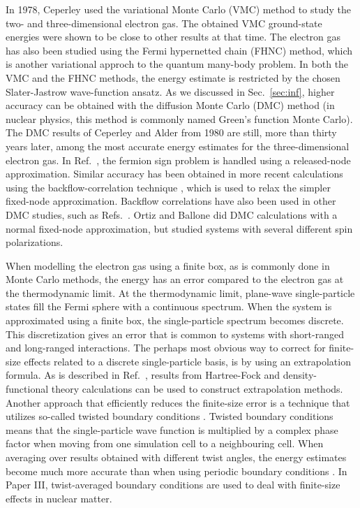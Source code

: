 \documentclass[a4paper,12pt]{report}
\begin{document}
In 1978, Ceperley used \cite{ceperley1978} 
the variational Monte Carlo (VMC) method to 
study the two- and three-dimensional electron gas. The
obtained VMC ground-state energies were shown to be close
to other results at that time. The electron gas has also
been studied \cite{lantto1980} using the Fermi hypernetted 
chain (FHNC) method, which is another variational approch to the
quantum many-body problem. In both the VMC and the FHNC 
methods, the energy estimate is restricted by the chosen
Slater-Jastrow wave-function ansatz. As we discussed in 
Sec.~\ref{sec:inf}, higher accuracy can be obtained with
the diffusion Monte Carlo (DMC) method (in nuclear physics,
this method is commonly named Green's function Monte Carlo). 
The DMC results of Ceperley and Alder from 1980 
\cite{ceperley1980} are still, more than thirty years later, 
among the most accurate energy estimates for the 
three-dimensional electron gas. In Ref.~\cite{ceperley1980},
the fermion sign problem \cite{pudliner1997} is handled using 
a released-node approximation. Similar accuracy has been 
obtained in more recent calculations using the 
backflow-correlation technique \cite{kwon1998}, which is used 
to relax the simpler fixed-node approximation. Backflow 
correlations have also been used in other DMC studies, 
such as Refs.~\cite{holzmann2003,lopezrios2006,gurtubay2010}.
Ortiz and Ballone did DMC calculations \cite{ortiz1994} with 
a normal fixed-node approximation, but studied systems with
several different spin polarizations. 

When modelling the electron gas using a finite box, as is
commonly done in Monte Carlo methods, the energy has an error
compared to the electron gas at the thermodynamic limit. 
At the thermodynamic limit, plane-wave single-particle states
fill the Fermi sphere with a continuous spectrum. When the
system is approximated using a finite box, the 
single-particle spectrum becomes discrete. This 
discretization gives an 
error that is common to systems with short-ranged and 
long-ranged interactions. The perhaps most obvious way to
correct for finite-size effects related to a discrete 
single-particle basis, is by using an extrapolation formula.
As is described in Ref.~\cite{drummond2008}, results from
Hartree-Fock and density-functional theory calculations 
can be used to construct extrapolation methods. Another
approach that efficiently reduces the finite-size error
is a technique that utilizes so-called twisted boundary 
conditions \cite{lin2001}. Twisted boundary conditions 
means that the single-particle wave function is 
multiplied by a complex phase factor when moving from one 
simulation cell to a neighbouring cell. When averaging
over results obtained with different twist angles, the
energy estimates become much more accurate than when
using periodic boundary conditions \cite{lin2001}. In 
Paper III, twist-averaged boundary conditions are used to 
deal with finite-size effects in nuclear matter. 
\end{document}

